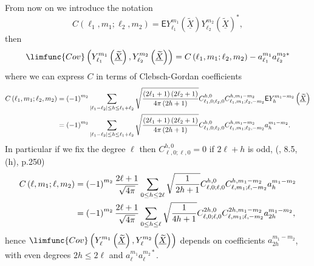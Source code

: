 \documentclass[preprint,11pt,a4paper]{elsarticle}
\begin{document}
From now on we introduce the notation 
\begin{equation*}
C\left( \ell_{1},m_{1};\ell_{2},m_{2}\right) =\mathsf{E}Y_{\ell_{1}}^{m_{1}}%
\left( \underline{\widetilde{X}}\right) Y_{\ell_{2}}^{m_{2}}\left( 
\underline{\widetilde{X}}\right) ^{\ast},
\end{equation*}
then 
\begin{equation}
\limfunc{Cov}\left( Y_{\ell_{1}}^{m_{1}}\left( \underline{\widetilde{X}}%
\right) ,Y_{\ell_{2}}^{m_{2}}\left( \underline{\widetilde{X}}\right) \right)
=C\left( \ell_{1},m_{1};\ell _{2},m_{2}\right)
-a_{\ell_{1}}^{m_{1}}a_{\ell_{2}}^{m_{2}\ast}  \label{Cov_Ylm}
\end{equation}
where we can express $C$ in terms of Clebsch-Gordan coefficients 
\begin{align}
C\left( \ell_{1},m_{1};\ell_{2},m_{2}\right) & =\left( -1\right)
^{m_{2}}\sum_{\left\vert \ell_{1}-\ell_{2}\right\vert \leq
h\leq\ell_{1}+\ell_{2}}\sqrt{\frac{\left( 2\ell_{1}+1\right) \left(
2\ell_{2}+1\right) }{4\pi\left( 2h+1\right) }}C_{\ell_{1},0;%
\ell_{2},0}^{h,0}C_{\ell_{1},m_{1};\ell_{2},-m_{2}}^{h,m_{1}-m_{2}}\mathsf{E}%
Y_{h}^{m_{1}-m_{2}}\left( \underline{\widetilde{X}}\right)  \notag \\
& =\left( -1\right) ^{m_{2}}\sum_{\left\vert \ell_{1}-\ell_{2}\right\vert
\leq h\leq\ell_{1}+\ell_{2}}\sqrt{\frac{\left( 2\ell_{1}+1\right) \left(
2\ell_{2}+1\right) }{4\pi\left( 2h+1\right) }}C_{\ell_{1},0;%
\ell_{2},0}^{h,0}C_{\ell_{1},m_{1};%
\ell_{2},-m_{2}}^{h,m_{1}-m_{2}}a_{h}^{m_{1}-m_{2}}.  \label{Exp_Prod Y_gen}
\end{align}
In particular if we fix the degree $\ell$ then $C_{\ell,0;\ell,0}^{h,0}=0$
if $2\ell+h$ is odd, (\cite{Varshalovich1988}, 8.5, (h), p.250) 
\begin{align*}
C\left( \ell,m_{1};\ell,m_{2}\right) & =\left( -1\right) ^{m_{2}}\frac{%
2\ell+1}{\sqrt{4\pi}}\sum_{0\leq h\leq2\ell}\sqrt{\frac{1}{2h+1}}%
C_{\ell,0;\ell,0}^{h,0}C_{\ell,m_{1};%
\ell,-m_{2}}^{h,m_{1}-m_{2}}a_{h}^{m_{1}-m_{2}} \\
& =\left( -1\right) ^{m_{2}}\frac{2\ell+1}{\sqrt{4\pi}}\sum_{0\leq h\leq\ell}%
\sqrt{\frac{1}{4h+1}}C_{\ell,0;\ell,0}^{2h,0}C_{\ell,m_{1};%
\ell,-m_{2}}^{2h,m_{1}-m_{2}}a_{2h}^{m_{1}-m_{2}},
\end{align*}
hence $\limfunc{Cov}\left( Y_{\ell}^{m_{1}}\left( \underline{\widetilde{X}}%
\right) ,Y_{\ell}^{m_{2}}\left( \underline{\widetilde{X}}\right) \right) $
depends on coefficients $a_{2h}^{m_{1}-m_{2}}$, with even degrees $%
2h\leq2\ell$ and $a_{\ell}^{m_{1}}a_{\ell}^{m_{2}\ast}$.
\end{document}
